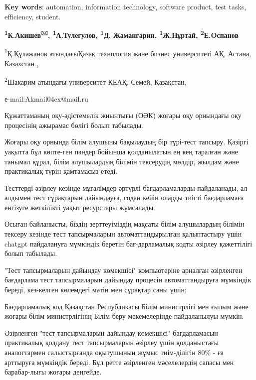 {\bfseries Key words}: automation, information technology, software
product, test tasks, efficiency, student.




\begin{center}
{\bfseries \textsuperscript{1}К.Акишев\textsuperscript{🖂},
\textsuperscript{1}А.Тулегулов, \textsuperscript{1}Д. Жамангарин,
\textsuperscript{1}Ж.Нұртай, \textsuperscript{2}Е.Oспанов}

\textsuperscript{1}Қ.Құлажанов атындағыҚазақ технология және бизнес
университеті АҚ, Астана, Казахстан ,

\textsuperscript{2}Шакарим атындағы университет КЕАҚ, Семей, Қазақстан,

е-mail:Akmail04cx@mail.ru
\end{center}

Құжаттаманың оқу-әдістемелік жиынтығы (ОӘК) жоғары оқу орнындағы оқу
процесінің ажырамас бөлігі болып табылады.

Жоғары оқу орнында білім алушыны бақылаудың бір түрі-тест тапсыру.
Қазіргі уақытта бұл көпте-ген пәндер бойынша қолданылатын ең кең таралған
және танымал құрал, білім алушылардың білімін тексерудің мөлдір, жылдам
және практикалық түрін қамтамасыз етеді.

Тесттерді әзірлеу кезінде мұғалімдер әртүрлі бағдарламаларды
пайдаланады, ал алдымен тест сұрақтарын дайындауға, содан кейін оларды
тиісті бағдарламаға енгізуге жеткілікті уақыт ресурстары жұмсалады.

Осыған байланысты, біздің зерттеуіміздің мақсаты білім алушылардың
білімін тексеру кезінде тест тапсырмаларын автоматтандырылған
қалыптастыру үшін chatgpt пайдалануға мүмкіндік беретін бағ-дарламалық
кодты әзірлеу қажеттілігі болып табылады.

"Тест тапсырмаларын дайындау көмекшісі" компьютеріне арналған әзірленген
бағдарлама тест тапсырмаларын дайындау процесін автоматтандыруға
мүмкіндік береді, кез-келген көлемдегі мәтін мен сұрақтар саны үшін;

Бағдарламалық код Қазақстан Республикасы Білім министрлігі мен ғылым
және жоғары білім министрлігінің Білім беру мекемелерінде пайдаланылуы
мүмкін.

Әзірленген "тест тапсырмаларын дайындау көмекшісі" бағдарламасын
практикалық қолдану тест тапсырмаларын әзірлеу үшін қолданыстағы
аналогтармен салыстырғанда оқытушының жұмыс тиім-ділігін 80\% - ға
арттыруға мүмкіндік береді. Бұл ретте әзірленген мәселелердің сапасы мен
барабар-лығы жоғары деңгейде.

